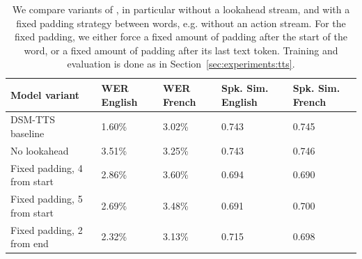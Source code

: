 \begin{table}[t]
\caption{Comparing \oursTTS{} trained with Mimi and with EnCodec~\citep{encodec}. The number of RVQ levels in EnCodec was selected to roughly match the number of tokens per second with Mimi, keeping still a sufficient number to ensure decent quality. Training and evaluations are done as in Table~\ref{tab:tts-libri}.}
\label{tab:tts-encodec}
\end{table}


\begin{table}[t]
\caption{We compare variants of \oursTTS{}, in particular without a lookahead stream, and with a fixed padding strategy between words, e.g. without an action stream. For the fixed padding, we either force a fixed amount of padding after the start of the word, or a fixed amount of padding after its last text token. Training and evaluation is done as in Section~\ref{sec:experiments:tts}.}
\label{tab:tts-variants}
\begin{tabular}{lllll}
\toprule
\textbf{Model variant}                       & \textbf{WER English} & \textbf{WER French} & \textbf{Spk. Sim. English} & \textbf{Spk. Sim. French} \\
\midrule
DSM-TTS baseline            & 1.60\%      & 3.02\%     & 0.743             & 0.745            \\
No lookahead                & 3.51\%      & 3.25\%     & 0.743             & 0.746            \\
Fixed padding, 4 from start & 2.86\%      & 3.60\%     & 0.694             & 0.690            \\
Fixed padding, 5 from start & 2.69\%      & 3.48\%     & 0.691             & 0.700            \\
Fixed padding, 2 from end   & 2.32\%      & 3.13\%     & 0.715             & 0.698           \\
\bottomrule
\end{tabular}
\end{table}

